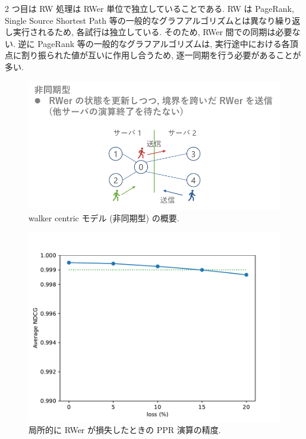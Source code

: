 2 つ目は RW 処理は RWer 単位で独立していることである. RW は PageRank, Single Source Shortest Path 等の一般的なグラフアルゴリズムとは異なり繰り返し実行されるため, 各試行は独立している. そのため, RWer 間での同期は必要ない. 逆に PageRank 等の一般的なグラフアルゴリズムは, 実行途中における各頂点に割り振られた値が互いに作用し合うため, 逐一同期を行う必要があることが多い. 

\begin{figure}[t]
    \centering
    \includegraphics[scale=0.8]{figure/walkercentric_async.pdf}
    \caption{walker centric モデル (非同期型) の概要.}
    \label{walker centric モデル (非同期型) の概要}
\end{figure}

\begin{figure}[t!]
    \centering
    \includegraphics[scale=0.7]{figure/eva_drop.pdf}
    \caption{局所的に RWer が損失したときの PPR 演算の精度.}
    \label{局所的に RWer が損失したときの PPR 演算の精度}
\end{figure}

